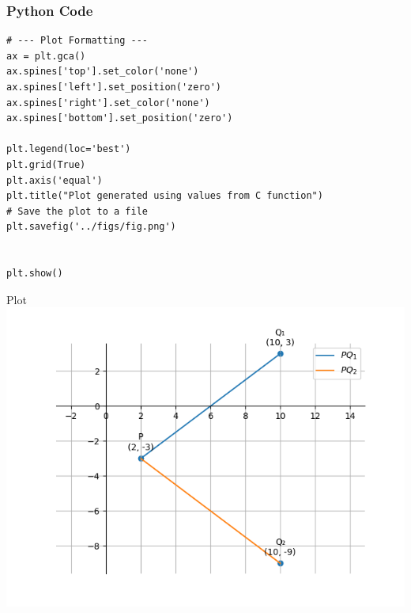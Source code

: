 \documentclass{beamer}
\begin{document}
\begin{frame}[fragile]
    \frametitle{Python Code}
    \begin{lstlisting}
# --- Plot Formatting ---
ax = plt.gca()
ax.spines['top'].set_color('none')
ax.spines['left'].set_position('zero')
ax.spines['right'].set_color('none')
ax.spines['bottom'].set_position('zero')

plt.legend(loc='best')
plt.grid(True)
plt.axis('equal')
plt.title("Plot generated using values from C function")
# Save the plot to a file
plt.savefig('../figs/fig.png')


plt.show()

    \end{lstlisting}
\end{frame}


\begin{frame}{Plot}
    \centering
    \includegraphics[width=\columnwidth, height=0.8\textheight, keepaspectratio]{figs/fig.png}     
\end{frame}
\end{document}
